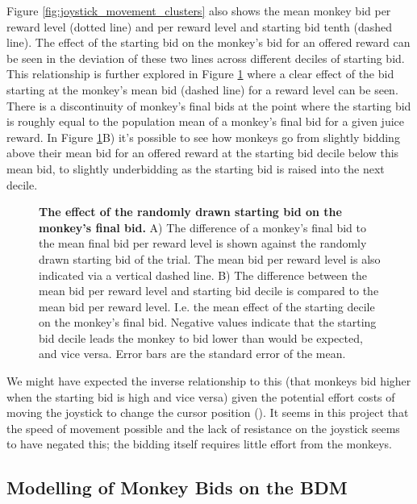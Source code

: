 Figure \ref{fig:joystick_movement_clusters} also shows the mean monkey bid per reward level (dotted line) and per reward level and starting bid tenth (dashed line). The effect of the starting bid on the monkey’s bid for an offered reward can be seen in the deviation of these two lines across different deciles of starting bid. This relationship is further explored in Figure \ref{fig:monkey_starting_bid} where a clear effect of the bid starting at the monkey’s mean bid (dashed line) for a reward level can be seen. There is a discontinuity of monkey’s final bids at the point where the starting bid is roughly equal to the population mean of a monkey’s final bid for a given juice reward. In Figure \ref{fig:monkey_starting_bid}B) it's possible to see how monkeys go from slightly bidding above their mean bid for an offered reward at the starting bid decile below this mean bid, to slightly underbidding as the starting bid is raised into the next decile. 

\begin{figure}[p] 
\centering    

\caption[The effect of the randomly drawn starting bid on the monkey’s final bid.]{\textbf{The effect of the randomly drawn starting bid on the monkey’s final bid.} A) The difference of a monkey’s final bid to the mean final bid per reward level is shown against the randomly drawn starting bid of the trial. The mean bid per reward level is also indicated via a vertical dashed line. B) The difference between the mean bid per reward level and starting bid decile is compared to the mean bid per reward level. I.e. the mean effect of the starting decile on the monkey’s final bid. Negative values indicate that the starting bid decile leads the monkey to bid lower than would be expected, and vice versa. Error bars are the standard error of the mean.}
\label{fig:monkey_starting_bid}
\end{figure}

We might have expected the inverse relationship to this (that monkeys bid higher when the starting bid is high and vice versa) given the potential effort costs of moving the joystick to change the cursor position (\cite{burrellWorthWorkMonkeys2023}). It seems in this project that the speed of movement possible and the lack of resistance on the joystick seems to have negated this; the bidding itself requires little effort from the monkeys.

\subsection{Modelling of Monkey Bids on the BDM}


